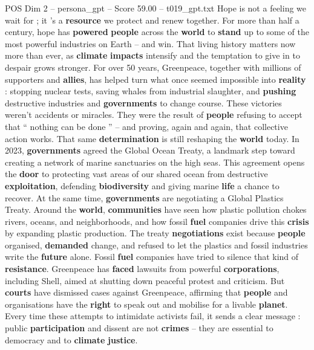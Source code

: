 \begin{textsample}{POS Dim 2 – persona\_gpt – Score 59.00 – t019\_gpt.txt}  \label{ex:f2_pos_012}
Hope is not a feeling we wait for ; it ’s a \textbf{resource} we protect and renew together.
For more than half a century, hope has \textbf{powered} \textbf{people} across the \textbf{world} to \textbf{stand} up to some of the most powerful industries on Earth – and win.
That living history matters now more than ever, as \textbf{climate} \textbf{impacts} intensify and the temptation to give in to despair grows stronger.
For over 50 years, Greenpeace, together with millions of supporters and \textbf{allies}, has helped turn what once seemed impossible into \textbf{reality} : stopping nuclear tests, saving whales from industrial slaughter, and \textbf{pushing} destructive industries and \textbf{governments} to change course.
These victories weren't accidents or miracles.
They were the result of \textbf{people} refusing to accept that “ nothing can be done ” – and proving, again and again, that collective action works.
That same \textbf{determination} is still reshaping the \textbf{world} today.
In 2023, \textbf{governments} agreed the Global Ocean Treaty, a landmark step toward creating a network of marine sanctuaries on the high seas.
This agreement opens the \textbf{door} to protecting vast areas of our shared ocean from destructive \textbf{exploitation}, defending \textbf{biodiversity} and giving marine \textbf{life} a chance to recover.
At the same time, \textbf{governments} are negotiating a Global Plastics Treaty.
Around the \textbf{world}, \textbf{communities} have seen how plastic pollution chokes rivers, oceans, and neighborhoods, and how fossil \textbf{fuel} companies drive this \textbf{crisis} by expanding plastic production.
The treaty \textbf{negotiations} exist because \textbf{people} organised, \textbf{demanded} change, and refused to let the plastics and fossil industries write the \textbf{future} alone.
Fossil \textbf{fuel} companies have tried to silence that kind of \textbf{resistance}.
Greenpeace has \textbf{faced} lawsuits from powerful \textbf{corporations}, including Shell, aimed at shutting down peaceful protest and criticism.
But \textbf{courts} have dismissed cases against Greenpeace, affirming that \textbf{people} and organisations have the \textbf{right} to speak out and mobilise for a livable \textbf{planet}.
Every time these attempts to intimidate activists fail, it sends a clear message : public \textbf{participation} and dissent are not \textbf{crimes} – they are essential to democracy and to \textbf{climate} \textbf{justice}.

\end{textsample}
